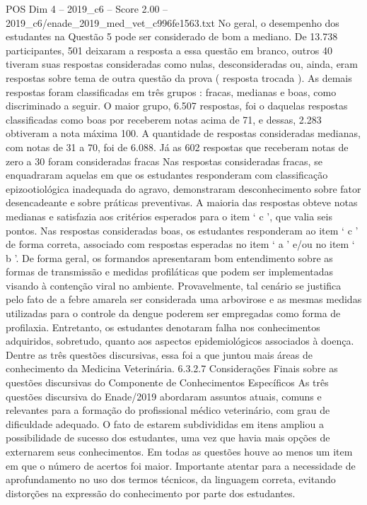 \begin{textsample}{POS Dim 4 – 2019\_c6 – Score 2.00 – 2019\_c6/enade\_2019\_med\_vet\_c996fe1563.txt}
No geral, o desempenho dos estudantes na Questão 5 pode ser considerado de bom a mediano.
De 13.738 participantes, 501 deixaram a resposta a essa questão em branco, outros 40 tiveram suas respostas consideradas como nulas, desconsideradas ou, ainda, eram respostas sobre tema de outra questão da prova ( resposta trocada ).
As demais respostas foram classificadas em três grupos : fracas, medianas e boas, como discriminado a seguir.
O maior grupo, 6.507 respostas, foi o daquelas respostas classificadas como boas por receberem notas acima de 71, e dessas, 2.283 obtiveram a nota máxima 100.
A quantidade de respostas consideradas medianas, com notas de 31 a 70, foi de 6.088.
Já as 602 respostas que receberam notas de zero a 30 foram consideradas fracas Nas respostas consideradas fracas, se enquadraram aquelas em que os estudantes responderam com classificação epizootiológica inadequada do agravo, demonstraram desconhecimento sobre fator desencadeante e sobre práticas preventivas.
A maioria das respostas obteve notas medianas e satisfazia aos critérios esperados para o item ‘ c ’, que valia seis pontos.
Nas respostas consideradas boas, os estudantes responderam ao item ‘ c ’ de forma correta, associado com respostas esperadas no item ‘ a ’ e/ou no item ‘ b ’.
De forma geral, os formandos apresentaram bom entendimento sobre as formas de transmissão e medidas profiláticas que podem ser implementadas visando à contenção viral no ambiente.
Provavelmente, tal cenário se justifica pelo fato de a febre amarela ser considerada uma arbovirose e as mesmas medidas utilizadas para o controle da dengue poderem ser empregadas como forma de profilaxia.
Entretanto, os estudantes denotaram falha nos conhecimentos adquiridos, sobretudo, quanto aos aspectos epidemiológicos associados à doença.
Dentre as três questões discursivas, essa foi a que juntou mais áreas de conhecimento da Medicina Veterinária. 6.3.2.7 Considerações Finais sobre as questões discursivas do Componente de Conhecimentos Específicos As três questões discursiva do Enade/2019 abordaram assuntos atuais, comuns e relevantes para a formação do profissional médico veterinário, com grau de dificuldade adequado.
O fato de estarem subdivididas em itens ampliou a possibilidade de sucesso dos estudantes, uma vez que havia mais opções de externarem seus conhecimentos.
Em todas as questões houve ao menos um item em que o número de acertos foi maior.
Importante atentar para a necessidade de aprofundamento no uso dos termos técnicos, da linguagem correta, evitando distorções na expressão do conhecimento por parte dos estudantes.

\end{textsample}
